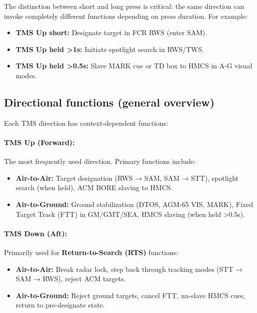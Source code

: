 \documentclass[11pt, a4paper, twoside]{report}
\begin{document}
The distinction between short and long press is critical: the same direction can invoke completely different functions depending on press duration. For example:
\begin{itemize}
    \item \textbf{TMS Up short:} Designate target in FCR RWS (enter SAM).
    \item \textbf{TMS Up held >1s:} Initiate spotlight search in RWS/TWS.
    \item \textbf{TMS Up held >0.5s:} Slave MARK cue or TD box to HMCS in A-G visual modes.
\end{itemize}

\subsection{Directional functions (general overview)}
\label{sec:C4-S1-S2}

Each TMS direction has context-dependent functions:

\paragraph{TMS Up (Forward):}
The most frequently used direction. Primary functions include:
\begin{itemize}
    \item \textbf{Air-to-Air:} Target designation (RWS → SAM, SAM → STT), spotlight search (when held), ACM BORE slaving to HMCS.
    \item \textbf{Air-to-Ground:} Ground stabilization (DTOS, AGM-65 VIS, MARK), Fixed Target Track (FTT) in GM/GMT/SEA, HMCS slaving (when held >0.5s).
\end{itemize}

\paragraph{TMS Down (Aft):}
Primarily used for \textbf{Return-to-Search (RTS)} functions:
\begin{itemize}
    \item \textbf{Air-to-Air:} Break radar lock, step back through tracking modes (STT → SAM → RWS), reject ACM targets.
    \item \textbf{Air-to-Ground:} Reject ground targets, cancel FTT, un-slave HMCS cues, return to pre-designate state.
\end{itemize}
\end{document}
